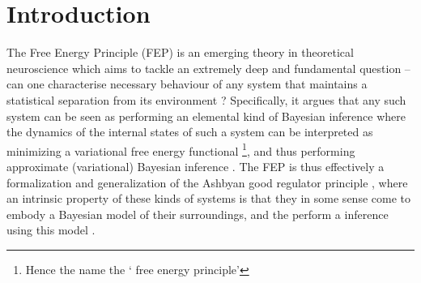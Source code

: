 \chapter{Introduction}
% 
The Free Energy Principle (FEP) \citep{friston2006free,friston2012free,friston2019particularphysics,parr2020markov} is an emerging theory in theoretical neuroscience which aims to tackle an extremely deep and fundamental question -- can one characterise necessary behaviour of any system that maintains a statistical separation from its environment \citep{parr2020markov,friston2019particularphysics,bruineberg2020emperor}? Specifically, it argues that any such system can be seen as performing an elemental kind of Bayesian inference where the dynamics of the internal states of such a system can be interpreted as minimizing a variational free energy functional \citep{beal2003variational} \footnote{Hence the name the ` free energy principle'}, and thus performing approximate (variational) Bayesian inference \citep{friston2019particularphysics}. The FEP is thus effectively a formalization and generalization of the Ashbyan good regulator principle \citep{conant1970every}, where an intrinsic property of these kinds of systems is that they in some sense come to embody a Bayesian model of their surroundings, and the perform a inference using this model \citep{baltieri2020predictions}.

